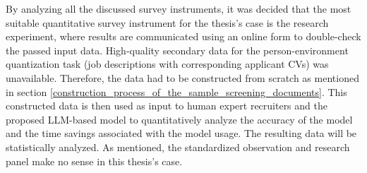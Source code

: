 \documentclass[draft,final]{thesisclass} %
\begin{document}
By analyzing all the discussed survey instruments, it was decided that the most suitable quantitative survey instrument for the thesis's case is the research experiment, where results are communicated using an online form to double-check the passed input data.
High-quality secondary data for the person-environment quantization task (job descriptions with corresponding applicant \acs{CV}s) was unavailable. Therefore, the data had to be constructed from scratch as mentioned in section \ref{construction_process_of_the_sample_screening_documents}.
This constructed data is then used as input to human expert recruiters and the proposed \gls{LLM}-based model to quantitatively analyze the accuracy of the model and the time savings associated with the model usage.
The resulting data will be statistically analyzed.
As mentioned, the standardized observation and research panel make no sense in this thesis's case.
\end{document}
